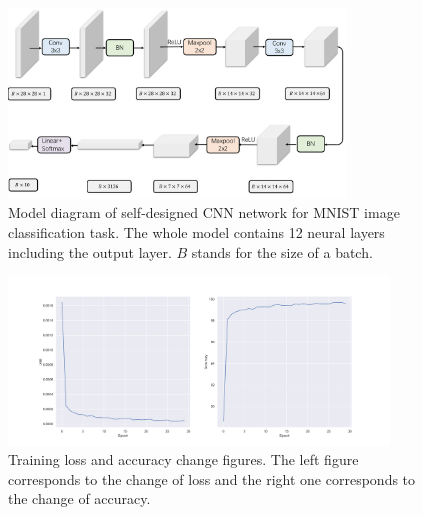 

\begin{figure}[htbp]
    \centering
    \includegraphics[width=0.8\textwidth]{cnn.pdf}
    \caption{Model diagram of self-designed CNN network for MNIST image classification task. The whole model contains 12 neural layers including the output layer. $B$ stands for the size of a batch.}
    \label{fig:CNN_arch}
\end{figure}

\begin{figure}[htbp]
    \centering
    \includegraphics[width=0.9\textwidth]{../images/mnist-train-loss-acc.png}
    \caption{Training loss and accuracy change figures. The left figure corresponds to the change of loss and the right one corresponds to the change of accuracy.}
    \label{fig:cnn_loss_acc}
\end{figure}

